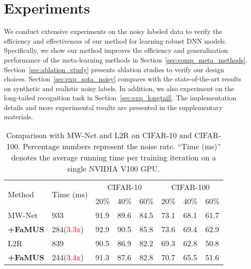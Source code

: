 \documentclass[final]{cvpr}
\begin{document}
\section{Experiments}
We conduct extensive experiments on the noisy labeled data to verify the efficiency and effectiveness of our method for learning robust DNN models. Specifically, we show our method improves the efficiency and generalization performance of the meta-learning methods in Section~\ref{sec:comp_meta_methods}. Section~\ref{sec:ablation_study} presents ablation studies to verify our design choices.
Section~\ref{sec:exp_sota_noisy} compares with the state-of-the-art results on synthetic and realistic noisy labels. In addition, we also experiment on the long-tailed recognition task in Section~\ref{sec:exp_longtail}.
The implementation details and more experimental results are presented in the supplementary materials.


\begin{table}[t]
	\centering
	\footnotesize
	\begin{tabular}{|l|p{1.0cm}|p{0.4cm}p{0.4cm}p{0.4cm}|p{0.4cm}p{0.4cm}p{0.4cm}|}
	\hline
	\multirow{2}{*}{Method}  & \multirow{2}{*}{Time (ms)} & \multicolumn{3}{|c|}{CIFAR-10} & \multicolumn{3}{|c|}{CIFAR-100} \\
	\cline{3-8}
	& & 20\% & 40\% & 60\% & 20\% & 40\% & 60\% \\
	\hline
	\small{MW-Net~\cite{shu2019meta}} & 933 & 91.9 & 89.6 & 84.5 & 73.1 & 68.1 & 61.7  \\
	\hline
	\textbf{+FaMUS} & 284(\textcolor{red}{3.3x}) & 92.9 & 90.5 & 85.8 & 73.6 & 69.4 & 62.9  \\
	\hline\hline
	L2R~\cite{ren2018learning}& 839 & 90.5 & 86.9 & 82.2 & 69.3 & 62.8 & 50.8  \\
	\hline
	\textbf{+FaMUS} & 244(\textcolor{red}{3.4x}) & 91.3 & 87.6 & 82.8 & 70.7 &	65.5 & 51.6  \\
	\hline
	\end{tabular}
	\vspace{-2mm}
	\caption{Comparison with MW-Net and L2R on CIFAR-10 and CIFAR-100. Percentage numbers represent the noise rate. ``Time (ms)'' denotes the average running time per training iteration on a single NVIDIA V100 GPU. 
	}\label{tab:comp_mwn_and_l2r}
\end{table} 
\end{document}
